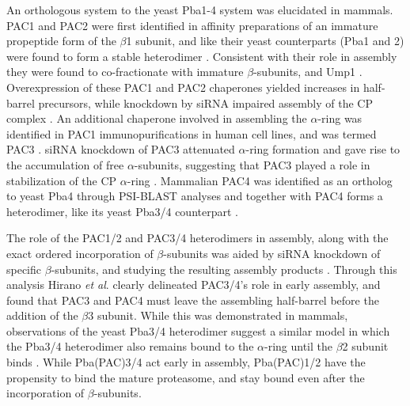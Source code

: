 	An orthologous system to the yeast Pba1-4 system was elucidated in mammals. PAC1 and PAC2 were first identified in affinity preparations of an immature propeptide form of the $\beta$1 subunit, and like their yeast counterparts (Pba1 and 2) were found to form a stable heterodimer \citep{hirano05}. Consistent with their role in assembly they were found to co-fractionate with immature $\beta$-subunits, and Ump1 \citep{hirano05}. Overexpression of these PAC1 and PAC2 chaperones yielded increases in half- barrel precursors, while knockdown by siRNA impaired assembly of the CP complex \citep{hirano05}. An additional chaperone involved in assembling the $\alpha$-ring was identified in PAC1 immunopurifications in human cell lines, and was termed PAC3 \citep{hirano06}. siRNA knockdown of PAC3 attenuated $\alpha$-ring formation and gave rise to the accumulation of free $\alpha$-subunits, suggesting that PAC3 played a role in stabilization of the CP $\alpha$-ring \citep{hirano06}. Mammalian PAC4 was identified as an ortholog to yeast Pba4 through PSI-BLAST analyses \citep{kusmierczyk08} and together with PAC4 forms a heterodimer, like its yeast Pba3/4 counterpart \citep{le07}.
	
	The role of the PAC1/2 and PAC3/4 heterodimers in assembly, along with the exact ordered incorporation of $\beta$-subunits was aided by siRNA knockdown of specific $\beta$-subunits, and studying the resulting assembly products \citep{hirano08}. Through this analysis Hirano \textit{et al}. clearly delineated PAC3/4's role in early assembly, and found that PAC3 and PAC4 must leave the assembling half-barrel before the addition of the $\beta$3 subunit. While this was demonstrated in mammals, observations of the yeast Pba3/4 heterodimer suggest a similar model in which the Pba3/4 heterodimer also remains bound to the $\alpha$-ring until the $\beta$2 subunit binds \citep{kusmierczyk08, yashiroda08}. While Pba(PAC)3/4 act early in assembly, Pba(PAC)1/2 have the propensity to bind the mature proteasome, and stay bound even after the incorporation of $\beta$-subunits.
	

